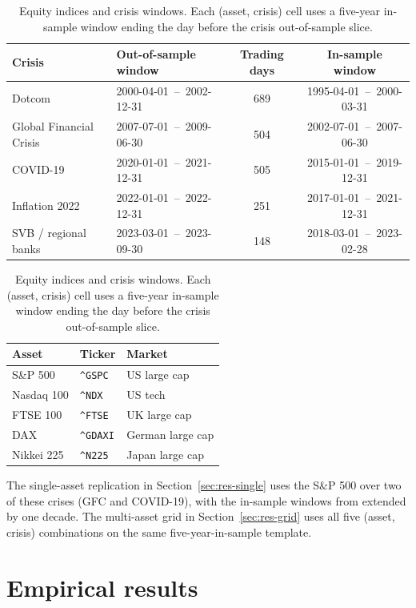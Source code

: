 \documentclass[11pt,a4paper]{article}
\newcommand{\code}[1]{\texttt{\small #1}}
\theoremstyle{plain}
\begin{document}
\begin{table}[ht]
\centering
\caption{Equity indices and crisis windows. Each (asset, crisis) cell
uses a five-year in-sample window ending the day before the crisis
out-of-sample slice.}
\label{tab:data}
\small
\begin{tabular}{@{}llcc@{}}
\toprule
\textbf{Crisis} & \textbf{Out-of-sample window} & \textbf{Trading days} & \textbf{In-sample window} \\
\midrule
Dotcom              & 2000-04-01 \,--\, 2002-12-31 & 689 & 1995-04-01 \,--\, 2000-03-31 \\
Global Financial Crisis & 2007-07-01 \,--\, 2009-06-30 & 504 & 2002-07-01 \,--\, 2007-06-30 \\
COVID-19            & 2020-01-01 \,--\, 2021-12-31 & 505 & 2015-01-01 \,--\, 2019-12-31 \\
Inflation 2022      & 2022-01-01 \,--\, 2022-12-31 & 251 & 2017-01-01 \,--\, 2021-12-31 \\
SVB / regional banks & 2023-03-01 \,--\, 2023-09-30 & 148 & 2018-03-01 \,--\, 2023-02-28 \\
\bottomrule
\end{tabular}
\smallskip

\begin{tabular}{@{}lll@{}}
\toprule
\textbf{Asset} & \textbf{Ticker} & \textbf{Market} \\
\midrule
S\&P 500            & \code{\^{}GSPC}   & US large cap \\
Nasdaq 100          & \code{\^{}NDX}    & US tech \\
FTSE 100            & \code{\^{}FTSE}   & UK large cap \\
DAX                 & \code{\^{}GDAXI}  & German large cap \\
Nikkei 225          & \code{\^{}N225}   & Japan large cap \\
\bottomrule
\end{tabular}
\end{table}

The single-asset replication in Section~\ref{sec:res-single} uses the
S\&P 500 over two of these crises (GFC and COVID-19), with the
in-sample windows from \citet{du_escanciano_2017} extended by one
decade. The multi-asset grid in Section~\ref{sec:res-grid} uses all
five (asset, crisis) combinations on the same five-year-in-sample
template.

\section{Empirical results}
\label{sec:results}
\end{document}
